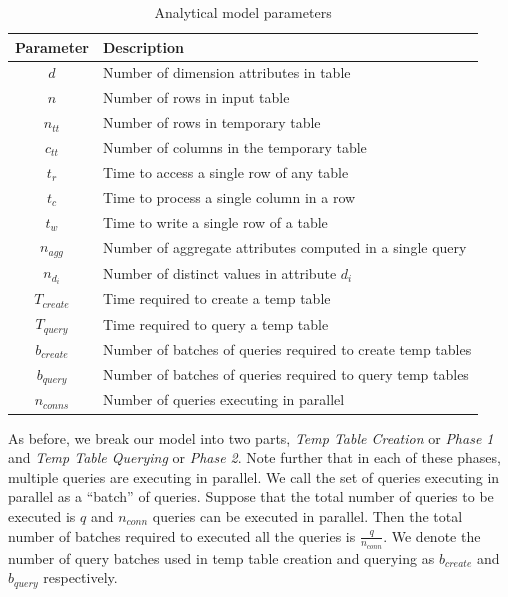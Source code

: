 \begin{table}
{\center
\vspace{-10pt}
\begin{tabular}[h]{|c|l|}
\hline
Parameter & Description \\ \hline
$d$ & Number of dimension attributes in table \\
$n$ & Number of rows in input table \\
$n_{tt}$ & Number of rows in temporary table \\
$c_{tt}$ & Number of columns in the temporary table \\
$t_r$ & Time to access a single row of any table \\
$t_c$ & Time to process a single column in a row \\
$t_w$ & Time to write a single row of a table \\
$n_{agg}$ & Number of aggregate attributes computed in a single query \\
$n_{d_{i}}$ & Number of distinct values in attribute $d_i$ \\
$T_{create}$ & Time required to create a temp table \\
$T_{query}$ & Time required to query a temp table \\ 
$b_{create}$ & Number of batches of queries required to create temp tables \\
$b_{query}$ & Number of batches of queries required to query temp tables \\
$n_{conns}$ & Number of queries executing in parallel \\ \hline
\end{tabular}
\vspace{-10pt}
\caption{Analytical model parameters \label{tab:model_params}}
}
\end{table}


As before, we break our model into two parts, {\it Temp Table Creation} or {\it
Phase 1} and {\it Temp Table Querying} or {\it Phase 2}. Note further that in
each of these phases, multiple queries are executing in parallel. We call the
set of queries executing in parallel as a ``batch'' of queries. Suppose that the
total number of queries to be executed is $q$ and $n_{conn}$ queries can be
executed in parallel. Then the total number of batches required to executed all
the queries is $\frac{q}{n_{conn}}$. We denote the number of query batches used
in temp table creation and querying as $b_{create}$ and $b_{query}$ respectively.

